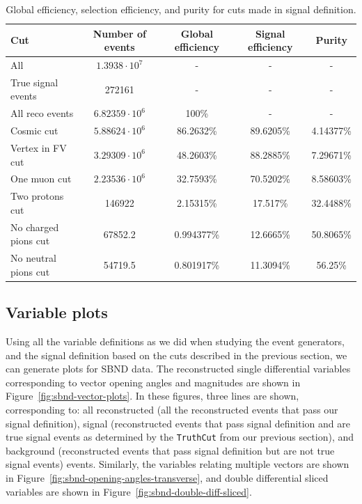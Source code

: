 \documentclass{article}
\begin{document}
\begin{table}
    \begin{center}
        \begin{tabular}{|l|cccc|}
        \hline
        \textbf{Cut}         & \textbf{Number of events} & \textbf{Global efficiency} & \textbf{Signal efficiency} & \textbf{Purity} \\ \hline
        All                  & $1.3938\cdot10^7$ & -       & -       & -      \\
        True signal events   & 272161 & -       & -       & -      \\
        All reco events      & $6.82359\cdot10^6$ & 100\%   & -       & -      \\
        Cosmic cut           & $5.88624\cdot10^6$ & 86.2632\% & 89.6205\% & 4.14377\% \\
        Vertex in FV cut     & $3.29309\cdot10^6$ & 48.2603\% & 88.2885\% & 7.29671\% \\
        One muon cut         & $2.23536\cdot10^6$ & 32.7593\% & 70.5202\% & 8.58603\% \\
        Two protons cut      & 146922 & 2.15315\%  & 17.517\% & 32.4488\% \\
        No charged pions cut & 67852.2 & 0.994377\%  & 12.6665\% & 50.8065\% \\
        No neutral pions cut & 54719.5 & 0.801917\%  & 11.3094\% & 56.25\% \\ \hline
        \end{tabular}
    \end{center}
    \caption{Global efficiency, selection efficiency, and purity for cuts made in signal definition.}
    \label{table:cut-efficiency-purity}
\end{table}

\clearpage

\subsection{Variable plots}

Using all the variable definitions as we did when studying the event generators, and the signal definition based on the cuts described in the previous section, 
we can generate plots for SBND data. The reconstructed single differential variables corresponding to vector opening angles and magnitudes are shown in 
Figure~\ref{fig:sbnd-vector-plots}. In these figures, three lines are shown, corresponding to: all reconstructed (all the reconstructed events that pass our signal definition), 
signal (reconstructed events that pass signal definition and are true signal events as determined by the \verb|TruthCut| from our previous section), and background 
(reconstructed events that pass signal definition but are not true signal events) events. Similarly, the variables relating multiple vectors are shown in Figure~\ref{fig:sbnd-opening-angles-transverse}, 
and double differential sliced variables are shown in Figure~\ref{fig:sbnd-double-diff-sliced}.
\end{document}
